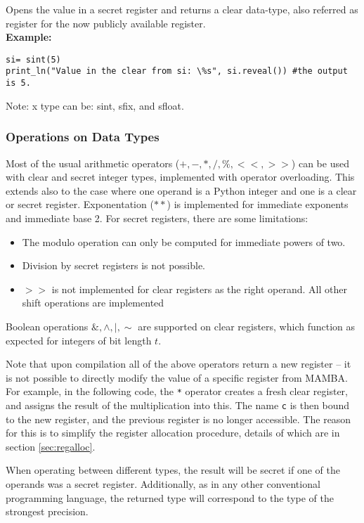 Opens the value in a secret register and returns a clear data-type, 
also referred as register for the now publicly available register.\\
\textbf{Example:}
\begin{lstlisting}
si= sint(5)
print_ln("Value in the clear from si: \%s", si.reveal()) #the output is 5.
\end{lstlisting}
\begin{footnotesize}
Note: x type can be: sint, sfix, and sfloat.
\end{footnotesize}


\subsubsection{Operations on Data Types}
Most of the usual arithmetic operators ($+, -, *, /, \%, <<, >>$) can be used with
clear and secret integer types, implemented with operator overloading.
This extends also to the case where one operand is a Python integer and one
is a clear or secret register.
Exponentation ($**$) is implemented for immediate exponents and
immediate base 2.
For secret registers, there are some limitations:
\begin{itemize}
\item The modulo operation can only be computed for immediate powers
  of two.
\item Division by secret registers is not possible.
\item $>>$ is not implemented for clear registers as the right
  operand. All other shift operations are implemented
\end{itemize}
Boolean operations $\&, \wedge, |, \sim$ are supported on clear registers,
which function as expected for integers of bit length $t$.

Note that upon compilation all of the above operators return a 
new register -- it is not possible to directly modify the value 
of a specific register from MAMBA.
For example, in the following code, the \verb|*| operator creates a
fresh clear register, and assigns the result of the multiplication into this.
The name \verb|c| is then bound to the new register, and the previous
register is no longer accessible. The reason for this is to simplify the
register allocation procedure, details of which are in section
\ref{sec:regalloc}.

When operating between different types, the result will be 
secret if one of the operands was a secret register. 
Additionally, as in any other conventional programming language, 
the returned type will correspond to the type of the strongest precision. 


